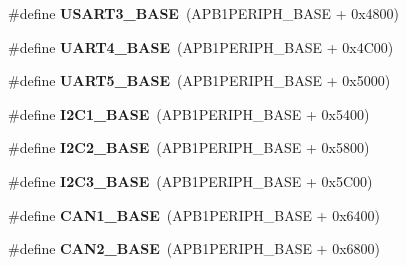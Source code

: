 \begin{DoxyCompactItemize}
\item 
\hypertarget{group___peripheral__memory__map_gabe0d6539ac0026d598274ee7f45b0251}{\#define {\bfseries U\-S\-A\-R\-T3\-\_\-\-B\-A\-S\-E}~(A\-P\-B1\-P\-E\-R\-I\-P\-H\-\_\-\-B\-A\-S\-E + 0x4800)}\label{group___peripheral__memory__map_gabe0d6539ac0026d598274ee7f45b0251}

\item 
\hypertarget{group___peripheral__memory__map_ga94d92270bf587ccdc3a37a5bb5d20467}{\#define {\bfseries U\-A\-R\-T4\-\_\-\-B\-A\-S\-E}~(A\-P\-B1\-P\-E\-R\-I\-P\-H\-\_\-\-B\-A\-S\-E + 0x4\-C00)}\label{group___peripheral__memory__map_ga94d92270bf587ccdc3a37a5bb5d20467}

\item 
\hypertarget{group___peripheral__memory__map_gaa155689c0e206e6994951dc3cf31052a}{\#define {\bfseries U\-A\-R\-T5\-\_\-\-B\-A\-S\-E}~(A\-P\-B1\-P\-E\-R\-I\-P\-H\-\_\-\-B\-A\-S\-E + 0x5000)}\label{group___peripheral__memory__map_gaa155689c0e206e6994951dc3cf31052a}

\item 
\hypertarget{group___peripheral__memory__map_gacd72dbffb1738ca87c838545c4eb85a3}{\#define {\bfseries I2\-C1\-\_\-\-B\-A\-S\-E}~(A\-P\-B1\-P\-E\-R\-I\-P\-H\-\_\-\-B\-A\-S\-E + 0x5400)}\label{group___peripheral__memory__map_gacd72dbffb1738ca87c838545c4eb85a3}

\item 
\hypertarget{group___peripheral__memory__map_ga04bda70f25c795fb79f163b633ad4a5d}{\#define {\bfseries I2\-C2\-\_\-\-B\-A\-S\-E}~(A\-P\-B1\-P\-E\-R\-I\-P\-H\-\_\-\-B\-A\-S\-E + 0x5800)}\label{group___peripheral__memory__map_ga04bda70f25c795fb79f163b633ad4a5d}

\item 
\hypertarget{group___peripheral__memory__map_ga4e8b9198748235a1729e1e8f8f24983b}{\#define {\bfseries I2\-C3\-\_\-\-B\-A\-S\-E}~(A\-P\-B1\-P\-E\-R\-I\-P\-H\-\_\-\-B\-A\-S\-E + 0x5\-C00)}\label{group___peripheral__memory__map_ga4e8b9198748235a1729e1e8f8f24983b}

\item 
\hypertarget{group___peripheral__memory__map_gad8e45ea6c032d9fce1b0516fff9d8eaa}{\#define {\bfseries C\-A\-N1\-\_\-\-B\-A\-S\-E}~(A\-P\-B1\-P\-E\-R\-I\-P\-H\-\_\-\-B\-A\-S\-E + 0x6400)}\label{group___peripheral__memory__map_gad8e45ea6c032d9fce1b0516fff9d8eaa}

\item 
\hypertarget{group___peripheral__memory__map_gaf7b8267b0d439f8f3e82f86be4b9fba1}{\#define {\bfseries C\-A\-N2\-\_\-\-B\-A\-S\-E}~(A\-P\-B1\-P\-E\-R\-I\-P\-H\-\_\-\-B\-A\-S\-E + 0x6800)}\label{group___peripheral__memory__map_gaf7b8267b0d439f8f3e82f86be4b9fba1}


\end{DoxyCompactItemize}
